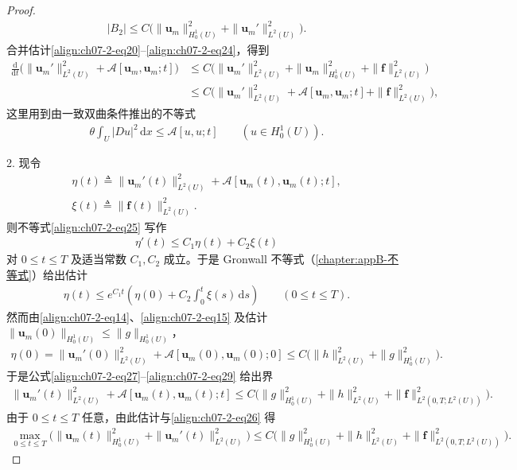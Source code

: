 \documentclass[../../main.tex]{subfiles}
\begin{document}
\begin{proof}
\begin{align}
|B_2|\leqslant C\bigl(\|\mathbf{u}_m\|_{H^1_0(U)}^2+\|\mathbf{u}_m'\|_{L^2(U)}^2\bigr).\label{align:ch07-2-eq24}
\end{align}
合并估计\eqref{align:ch07-2-eq20}--\eqref{align:ch07-2-eq24}，得到
\begin{align}
\frac{\mathrm{d}}{\mathrm{d}t}\bigl(\|\mathbf{u}_m'\|_{L^2(U)}^2+\mathcal{A}[\mathbf{u}_m,\mathbf{u}_m;t]\bigr)
&\leqslant C\bigl(\|\mathbf{u}_m'\|_{L^2(U)}^2+\|\mathbf{u}_m\|_{H^1_0(U)}^2+\|\mathbf{f}\|_{L^2(U)}^2\bigr)\nonumber\\
&\leqslant C\bigl(\|\mathbf{u}_m'\|_{L^2(U)}^2+\mathcal{A}[\mathbf{u}_m,\mathbf{u}_m;t]+\|\mathbf{f}\|_{L^2(U)}^2\bigr),\label{align:ch07-2-eq25}
\end{align}
这里用到由一致双曲条件推出的不等式
\begin{align}
\theta\int_U |Du|^2\,\mathrm{d}x\leqslant \mathcal{A}[u,u;t]\qquad (u\in H^1_0(U)).\label{align:ch07-2-eq26}
\end{align}

2. 现令
\begin{align}
\eta(t)\triangleq \|\mathbf{u}_m'(t)\|_{L^2(U)}^2+\mathcal{A}[\mathbf{u}_m(t),\mathbf{u}_m(t);t],\label{align:ch07-2-eq27}\\
\xi(t)\triangleq \|\mathbf{f}(t)\|_{L^2(U)}^2.\label{align:ch07-2-eq28}
\end{align}
则不等式\eqref{align:ch07-2-eq25} 写作
\begin{align*}
\eta'(t)\leqslant C_1\eta(t)+C_2\xi(t)
\end{align*}
对 $0\leqslant t\leqslant T$ 及适当常数 $C_1,C_2$ 成立。于是 Gronwall 不等式（\cref{chapter:appB-不等式}）给出估计
\begin{align}
\eta(t)\leqslant e^{C_1 t}\left(\eta(0)+C_2\int_0^t\xi(s)\,\mathrm{d}s\right)\qquad (0\leqslant t\leqslant T).\label{align:ch07-2-eq29}
\end{align}
然而由\eqref{align:ch07-2-eq14}、\eqref{align:ch07-2-eq15} 及估计 $\|\mathbf{u}_m(0)\|_{H^1_0(U)}\leqslant\|g\|_{H^1_0(U)}$，
\begin{align*}
\eta(0)=\|\mathbf{u}_m'(0)\|_{L^2(U)}^2+\mathcal{A}[\mathbf{u}_m(0),\mathbf{u}_m(0);0]\leqslant C\bigl(\|h\|_{L^2(U)}^2+\|g\|_{H^1_0(U)}^2\bigr).
\end{align*}
于是公式\eqref{align:ch07-2-eq27}--\eqref{align:ch07-2-eq29} 给出界
\begin{align*}
\|\mathbf{u}_m'(t)\|_{L^2(U)}^2+\mathcal{A}[\mathbf{u}_m(t),\mathbf{u}_m(t);t]
\leqslant C\bigl(\|g\|_{H^1_0(U)}^2+\|h\|_{L^2(U)}^2+\|\mathbf{f}\|_{L^2(0,T;L^2(U))}^2\bigr).
\end{align*}
由于 $0\leqslant t\leqslant T$ 任意，由此估计与\eqref{align:ch07-2-eq26} 得
\begin{align*}
\max_{0\leqslant t\leqslant T}\bigl(\|\mathbf{u}_m(t)\|_{H^1_0(U)}^2+\|\mathbf{u}_m'(t)\|_{L^2(U)}^2\bigr)
\leqslant C\bigl(\|g\|_{H^1_0(U)}^2+\|h\|_{L^2(U)}^2+\|\mathbf{f}\|_{L^2(0,T;L^2(U))}^2\bigr).
\end{align*}


\end{proof}
\end{document}
